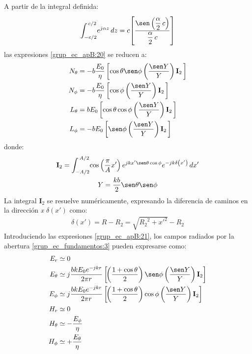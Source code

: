 A partir de la integral definida:
\begin{align}
\int_{-c/2}^{\,c/2}\!e^{j\alpha z}\,dz = c\!\left[\rule{0pt}{25pt}\dfrac{\sen\left(\dfrac{\alpha}{2}\, c\right)}{\dfrac{\alpha}{2}\, c}\right]
\label{ec_apB:112}
\end{align}
las expresiones \eqref{grup_ec_apB:20} se reducen a:
\begin{subequations}
\label{grup_ec_apB:21}
\begin{align}
N_{\theta} &= - b\dfrac{E_0}{\eta}\left[\cos\theta\sen\phi\left(\dfrac{\sen Y}{Y}\right)\mathbf{I}_2\,\right]
\label{ec_apB:113}\\
N_{\phi} &= - b\dfrac{E_0}{\eta}\left[\cos\phi\left(\dfrac{\sen Y}{Y}\right)\mathbf{I}_2\,\right]
\label{ec_apB:114}\\
L_{\theta} &= bE_0\left[\cos\theta\cos\phi\left(\dfrac{\sen Y}{Y}\right)\mathbf{I}_2\,\right]
\label{ec_apB:115}\\
L_{\phi} &= - bE_0\left[\sen\phi\left(\dfrac{\sen Y}{Y}\right)\mathbf{I}_2\,\right]
\label{ec_apB:116}
\end{align}
\end{subequations}
donde:
\begin{gather}
\mathbf{I}_2 = \int_{-A/2}^{\,A/2}\!\cos\left(\dfrac{\pi}{A}x'\right)e^{jkx'\sen\theta\cos\phi}e^{-jk\delta\left(x'\right)}\,dx'
\label{ec_apB:117}\\
Y = \frac{kb}{2}\sen\theta\sen\phi
\label{ec_apB:118}
\end{gather}
La integral $\mathbf{I}_2$ se resuelve numéricamente, expresando la diferencia de caminos en la dirección \emph{x} $\delta\left(x'\right)$ como:
\begin{align}
\delta\left(x'\right) = R - R_2 = \sqrt{{R_2}^2 + {x'}^2} - R_2
\label{ec_apB:119}
\end{align}
Introduciendo las expresiones \eqref{grup_ec_apB:21}, los campos radiados por la abertura \eqref{grup_ec_fundamentos:3} pueden expresarse como:
\begin{subequations}
\label{grup_ec_apB:22}
\begin{align}
E_r &\simeq 0
\label{ec_apB:120}\\
E_{\theta} &\simeq j\dfrac{bkE_0e^{-jkr}}{2\pi r}\left[\!\left(\dfrac{1 + \cos\theta}{2}\right)\sen\phi\left(\dfrac{\sen Y}{Y}\right)\mathbf{I}_2\right]
\label{ec_apB:121}\\
E_{\phi} &\simeq j\dfrac{bkE_0e^{-jkr}}{2\pi r}\left[\!\left(\dfrac{1 + \cos\theta}{2}\right)\cos\phi\left(\dfrac{\sen Y}{Y}\right)\mathbf{I}_2\right]
\label{ec_apB:122}\\
H_r &\simeq 0
\label{ec_apB:123}\\
H_\theta &\simeq -\frac{E_\phi}{\eta}
\label{ec_apB:124}\\
H_\phi &\simeq +\frac{E_\theta}{\eta}
\label{ec_apB:125}
\end{align}
\end{subequations}
